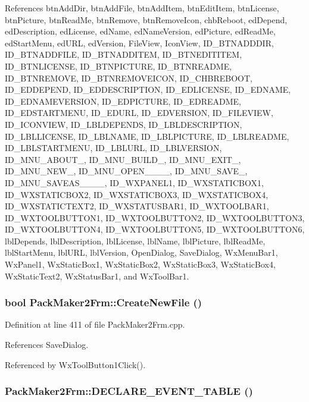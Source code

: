 References btn\-Add\-Dir, btn\-Add\-File, btn\-Add\-Item, btn\-Edit\-Item, btn\-License, btn\-Picture, btn\-Read\-Me, btn\-Remove, btn\-Remove\-Icon, chb\-Reboot, ed\-Depend, ed\-Description, ed\-License, ed\-Name, ed\-Name\-Version, ed\-Picture, ed\-Read\-Me, ed\-Start\-Menu, ed\-URL, ed\-Version, File\-View, Icon\-View, ID\_\-BTNADDDIR, ID\_\-BTNADDFILE, ID\_\-BTNADDITEM, ID\_\-BTNEDITITEM, ID\_\-BTNLICENSE, ID\_\-BTNPICTURE, ID\_\-BTNREADME, ID\_\-BTNREMOVE, ID\_\-BTNREMOVEICON, ID\_\-CHBREBOOT, ID\_\-EDDEPEND, ID\_\-EDDESCRIPTION, ID\_\-EDLICENSE, ID\_\-EDNAME, ID\_\-EDNAMEVERSION, ID\_\-EDPICTURE, ID\_\-EDREADME, ID\_\-EDSTARTMENU, ID\_\-EDURL, ID\_\-EDVERSION, ID\_\-FILEVIEW, ID\_\-ICONVIEW, ID\_\-LBLDEPENDS, ID\_\-LBLDESCRIPTION, ID\_\-LBLLICENSE, ID\_\-LBLNAME, ID\_\-LBLPICTURE, ID\_\-LBLREADME, ID\_\-LBLSTARTMENU, ID\_\-LBLURL, ID\_\-LBLVERSION, ID\_\-MNU\_\-ABOUT\_, ID\_\-MNU\_\-BUILD\_, ID\_\-MNU\_\-EXIT\_, ID\_\-MNU\_\-NEW\_, ID\_\-MNU\_\-OPEN\_\-\_\-\_\-\_, ID\_\-MNU\_\-SAVE\_, ID\_\-MNU\_\-SAVEAS\_\-\_\-\_\-\_, ID\_\-WXPANEL1, ID\_\-WXSTATICBOX1, ID\_\-WXSTATICBOX2, ID\_\-WXSTATICBOX3, ID\_\-WXSTATICBOX4, ID\_\-WXSTATICTEXT2, ID\_\-WXSTATUSBAR1, ID\_\-WXTOOLBAR1, ID\_\-WXTOOLBUTTON1, ID\_\-WXTOOLBUTTON2, ID\_\-WXTOOLBUTTON3, ID\_\-WXTOOLBUTTON4, ID\_\-WXTOOLBUTTON5, ID\_\-WXTOOLBUTTON6, lbl\-Depends, lbl\-Description, lbl\-License, lbl\-Name, lbl\-Picture, lbl\-Read\-Me, lbl\-Start\-Menu, lbl\-URL, lbl\-Version, Open\-Dialog, Save\-Dialog, Wx\-Menu\-Bar1, Wx\-Panel1, Wx\-Static\-Box1, Wx\-Static\-Box2, Wx\-Static\-Box3, Wx\-Static\-Box4, Wx\-Static\-Text2, Wx\-Status\-Bar1, and Wx\-Tool\-Bar1.
\subsubsection{\setlength{\rightskip}{0pt plus 5cm}bool Pack\-Maker2Frm::Create\-New\-File ()}\label{class_pack_maker2_frm_85bd181d068ffc42ee0cc08b84fb971d}




Definition at line 411 of file Pack\-Maker2Frm.cpp.

References Save\-Dialog.

Referenced by Wx\-Tool\-Button1Click().
\subsubsection{\setlength{\rightskip}{0pt plus 5cm}Pack\-Maker2Frm::DECLARE\_\-EVENT\_\-TABLE ()\hspace{0.3cm}{\tt  [private]}}\label{class_pack_maker2_frm_945cd0d35a08a0e6a4e3dad47e09491f}


